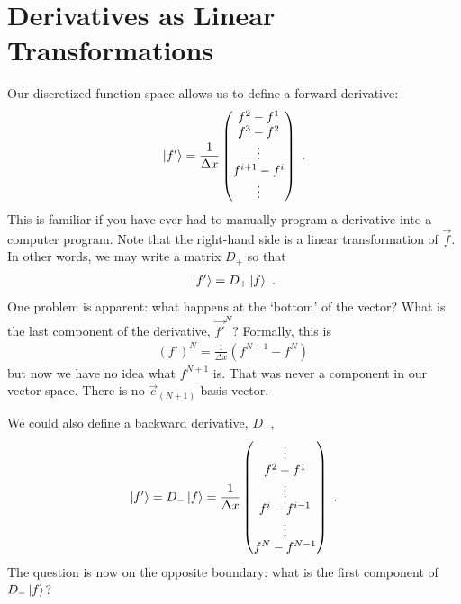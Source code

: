 \documentclass[12pt, oneside]{report}    %
\let\oldsection\section
\def\section{%
  \setcounter{sidenote}{1}%
  \oldsection
}
\begin{document}

\section{Derivatives as Linear Transformations}

Our discretized function space allows us to define a forward derivative:
\begin{align}
  \left|f'\right\rangle =
  \frac{1}{\Delta x}
  \begin{pmatrix}
    f^2 - f^1 \\
    f^3 - f^2 \\
    \vdots
    \\
    f^{i+1}-f^i
    \\
    \vdots
  \end{pmatrix} \ .
\end{align}
This is familiar if you have ever had to manually program a derivative into a computer program. Note that the right-hand side is a linear transformation of $\vec{f}$. In other words, we may write a matrix $D_+$ so that
\begin{align}
  \left|f'\right\rangle = D_+\left|f\right\rangle \ .
\end{align}
One problem is apparent: what happens at the `bottom’ of the vector? What is the last component of the derivative, $\vec{f'}^N$? Formally, this is
\begin{align}
  {(f')}^N = \frac{1}{\Delta x}(f^{N+1} - f^N) \,
\end{align}
but now we have no idea what $f^{N+1}$ is. That was never a component in our vector space. There is no $\vec{e}_{(N+1)}$ basis vector. 


We could also define a backward derivative, $D_-$,
\begin{align}
  \left|f'\right\rangle =
  D_- \left|f\right\rangle
  =
  \frac{1}{\Delta x}
  \begin{pmatrix}
    \vdots \\
    f^2 - f^1 \\
    \vdots
    \\
    f^{i}-f^{i-1}
    \\
    \vdots\\
    f^{N}-f^{N-1}
  \end{pmatrix} \ .
\end{align}
The question is now on the opposite boundary: what is the first component of $D_-\left|f\right\rangle$?
\end{document}
